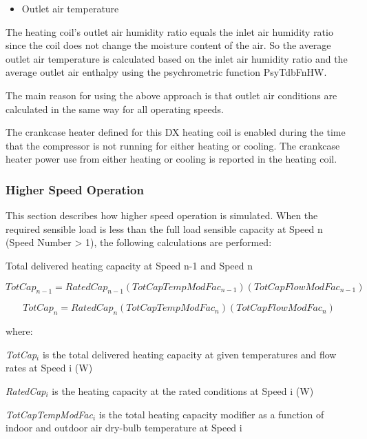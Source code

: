 \begin{itemize}
  \item Outlet air temperature
\end{itemize}

The heating coil's outlet air humidity ratio equals the inlet air humidity ratio since the coil does not change the moisture content of the air. So the average outlet air temperature is calculated based on the inlet air humidity ratio and the average outlet air enthalpy using the psychrometric function PsyTdbFnHW.

The main reason for using the above approach is that outlet air conditions are calculated in the same way for all operating speeds.

The crankcase heater defined for this DX heating coil is enabled during the time that the compressor is not running for either heating or cooling. The crankcase heater power use from either heating or cooling is reported in the heating coil.

\subsubsection{Higher Speed Operation}\label{higher-speed-operation-2}

This section describes how higher speed operation is simulated. When the required sensible load is less than the full load sensible capacity at Speed n (Speed Number \textgreater{} 1), the following calculations are performed:

Total delivered heating capacity at Speed n-1 and Speed n

\begin{equation}
  TotCa{p_{n - 1}} = RatedCa{p_{n - 1}}\left( {TotCapTempModFa{c_{n - 1}}} \right)\left( {TotCapFlowModFa{c_{n - 1}}} \right)
\end{equation}

\begin{equation}
  TotCa{p_n} = RatedCa{p_n}\left( {TotCapTempModFa{c_n}} \right)\left( {TotCapFlowModFa{c_n}} \right)
\end{equation}

where:

\emph{TotCap\(_{i}\)} is the total delivered heating capacity at given temperatures and flow rates at Speed i (W)

\emph{RatedCap\(_{i}\)} is the heating capacity at the rated conditions at Speed i (W)

\emph{TotCapTempModFac\(_{i}\)} is the total heating capacity modifier as a function of indoor and outdoor air dry-bulb temperature at Speed i

